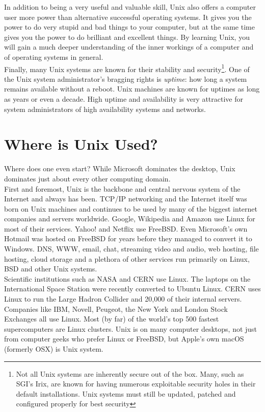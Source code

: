 In addition to being a very useful and valuable skill, Unix also offers a computer user more power than alternative successful operating systems.  It gives you the power to do very stupid and bad things to your computer, but at the same time gives you the power to do brilliant and excellent things.  By learning Unix, you will gain a much deeper understanding of the inner workings of a computer and of operating systems in general.\\

Finally, many Unix systems are known for their stability and security\footnote{Not all Unix systems are inherently secure out of the box.  Many, such as SGI's Irix, are known for having numerous exploitable security holes in their default installations.  Unix systems must still be updated, patched and configured properly for best security}.  One of the Unix system administrator's bragging rights is \textit{uptime}:  how long a system remains available without a reboot.  Unix machines are known for uptimes as long as years or even a decade.  High uptime and availability is very attractive for system administrators of high availability systems and networks.

\section{Where is Unix Used?}

Where does one even start?  While Microsoft dominates the desktop, Unix dominates just about every other computing domain.\\

First and foremost, Unix is the backbone and central nervous system of the Internet and always has been.  TCP/IP networking and the Internet itself was born on Unix machines and continues to be used by many of the biggest internet companies and servers worldwide.  Google, Wikipedia and Amazon use Linux for most of their services.  Yahoo! and Netflix use FreeBSD.  Even Microsoft's own Hotmail was hosted on FreeBSD for years before they managed to convert it to Windows.  DNS, WWW, email, chat, streaming video and audio, web hosting, file hosting, cloud storage and a plethora of other services run primarily on Linux, BSD and other Unix systems.\\

Scientific institutions such as NASA and CERN use Linux.  The laptops on the International Space Station were recently converted to Ubuntu Linux.  CERN uses Linux to run the Large Hadron Collider and 20,000 of their internal servers.  Companies like IBM, Novell, Peugeot, the New York and London Stock Exchanges all use Linux.  Most (by far) of the world's top 500 fastest supercomputers are Linux clusters.  Unix is on many computer desktops, not just from computer geeks who prefer Linux or FreeBSD, but Apple's own macOS (formerly OSX) is Unix system.\\

